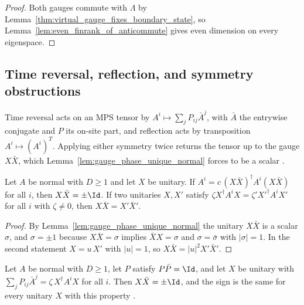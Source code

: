 \begin{proof}\leanok
    Both gauges commute with $\Lambda$ by
    Lemma~\ref{thm:virtual_gauge_fixes_boundary_state}, so
    Lemma~\ref{lem:even_finrank_of_anticommute} gives even dimension on every
    eigenspace.
\end{proof}

\subsection{Time reversal, reflection, and symmetry obstructions}
\label{sec:spt_time_reversal_reflection}

Time reversal acts on an MPS tensor by $A^i\mapsto\sum_j P_{ij}\bar A^j$, with
$\bar A$ the entrywise conjugate and $P$ its on-site part, and reflection acts by
transposition $A^i\mapsto(A^i)^{T}$.  Applying either symmetry twice returns the
tensor up to the gauge $X\bar X$, which Lemma~\ref{lem:gauge_phase_unique_normal}
forces to be a scalar \cite[Section~III.A]{Cirac2021Matrix}.

\begin{lemma}
    \label{lem:involution_index_of_twice}
    \leanok
    Let $A$ be normal with $D\ge1$ and let $X$ be unitary.  If
    $A^i=c\,(X\bar X)^\dagger A^i(X\bar X)$ for all $i$, then $X\bar X=\pm\Id$.
    If two unitaries $X,X'$ satisfy
    $\zeta X^\dagger A^iX=\zeta'X'^\dagger A^iX'$ for all $i$ with $\zeta\neq0$, then
    $X\bar X=X'\bar X'$.
\end{lemma}

\begin{proof}\leanok
    By Lemma~\ref{lem:gauge_phase_unique_normal} the unitary $X\bar X$ is a scalar
    $\sigma$, and $\sigma=\pm1$ because $X\bar X=\sigma$ implies
    $\bar X X=\sigma$ and $\sigma=\bar\sigma$ with $|\sigma|=1$.  In the second
    statement $X=u\,X'$ with $|u|=1$, so $X\bar X=|u|^2X'\bar X'$.
\end{proof}

\begin{lemma}
    \label{thm:time_reversal_index}
    \leanok
    Let $A$ be normal with $D\ge1$, let $P$ satisfy $P\bar P=\Id$, and let $X$ be
    unitary with $\sum_jP_{ij}\bar A^j=\zeta\,X^\dagger A^iX$ for all $i$.  Then
    $X\bar X=\pm\Id$, and the sign is the same for every unitary $X$ with this
    property \cite[Section~III.A]{Cirac2021Matrix}.
\end{lemma}


